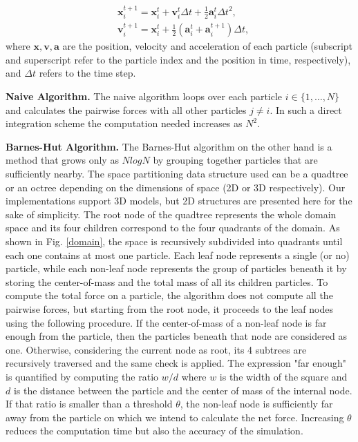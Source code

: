 \documentclass[letterpaper]{article}
\newcommand{\mypar}[1]{{\bf #1.}}
\begin{document}
\begin{align}
    & \mathbf{x}_i^{t+1} = \mathbf{x}_i^t + \mathbf{v}_i^t\Delta t + \frac{1}{2}\mathbf{a}_i^t\Delta t^2,\\
    & \mathbf{v}_i^{t+1} = \mathbf{x}_i^t + \frac{1}{2}(\mathbf{a}_i^t +\mathbf{a}_i^{t+1} )\Delta t,
\end{align}
where $\mathbf{x}, \mathbf{v}, \mathbf{a}$ are the position, velocity and acceleration of each particle (subscript and superscript refer to the particle index and the position in time, respectively), and $\Delta t$ refers to the time step. 

\mypar{Naive Algorithm}
The naive algorithm loops over each particle $i\in\{{1,\dots,N}\}$ and calculates the pairwise forces with all other particles $j{\ne} i$. In such a direct integration scheme the computation needed increases as $N^2$. 

\mypar{Barnes-Hut Algorithm} The Barnes-Hut algorithm on the other hand is a method that grows only as $NlogN$ by grouping together particles that are sufficiently nearby. The space partitioning data structure used can be a quadtree or an octree depending on the dimensions of space (2D or 3D respectively). Our implementations support 3D models, but 2D structures are presented here for the sake of simplicity. \newline
\indent The root node of the quadtree represents the whole domain space and its four children correspond to the four quadrants of the domain. As shown in Fig. \ref{domain}, the space is recursively subdivided into quadrants until each one contains at most one particle. Each leaf node represents a single (or no) particle, while each non-leaf node represents the group of particles beneath it by storing the center-of-mass and the total mass of all its children particles. \newline
\indent To compute the total force on a particle, the algorithm does not compute all the pairwise forces, but starting from the root node, it proceeds to the leaf nodes using the following procedure. If the center-of-mass of a non-leaf node is far enough from the particle, then the particles beneath that node are considered as one. Otherwise, considering the current node as root, its 4 subtrees are recursively traversed and the same check is applied. The expression "far enough" is quantified by computing the ratio $w/d$ where $w$ is the width of the square and $d$ is the distance between the particle and the center of mass of the internal node. If that ratio is smaller than a threshold $\theta$, the non-leaf node is sufficiently far away from the particle on which we intend to calculate the net force. Increasing $\theta$ reduces the computation time but also the accuracy of the simulation.
\end{document}
